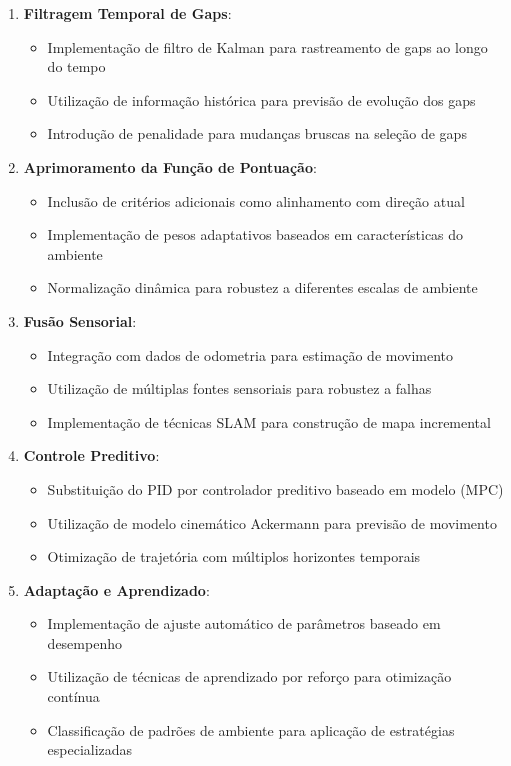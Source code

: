 \begin{enumerate}
    \item \textbf{Filtragem Temporal de Gaps}:
          \begin{itemize}
              \item Implementação de filtro de Kalman para rastreamento de gaps ao longo do tempo
              \item Utilização de informação histórica para previsão de evolução dos gaps
              \item Introdução de penalidade para mudanças bruscas na seleção de gaps
          \end{itemize}

    \item \textbf{Aprimoramento da Função de Pontuação}:
          \begin{itemize}
              \item Inclusão de critérios adicionais como alinhamento com direção atual
              \item Implementação de pesos adaptativos baseados em características do ambiente
              \item Normalização dinâmica para robustez a diferentes escalas de ambiente
          \end{itemize}

    \item \textbf{Fusão Sensorial}:
          \begin{itemize}
              \item Integração com dados de odometria para estimação de movimento
              \item Utilização de múltiplas fontes sensoriais para robustez a falhas
              \item Implementação de técnicas SLAM para construção de mapa incremental
          \end{itemize}

    \item \textbf{Controle Preditivo}:
          \begin{itemize}
              \item Substituição do PID por controlador preditivo baseado em modelo (MPC)
              \item Utilização de modelo cinemático Ackermann para previsão de movimento
              \item Otimização de trajetória com múltiplos horizontes temporais
          \end{itemize}

    \item \textbf{Adaptação e Aprendizado}:
          \begin{itemize}
              \item Implementação de ajuste automático de parâmetros baseado em desempenho
              \item Utilização de técnicas de aprendizado por reforço para otimização contínua
              \item Classificação de padrões de ambiente para aplicação de estratégias
                    especializadas
          \end{itemize}
\end{enumerate}

